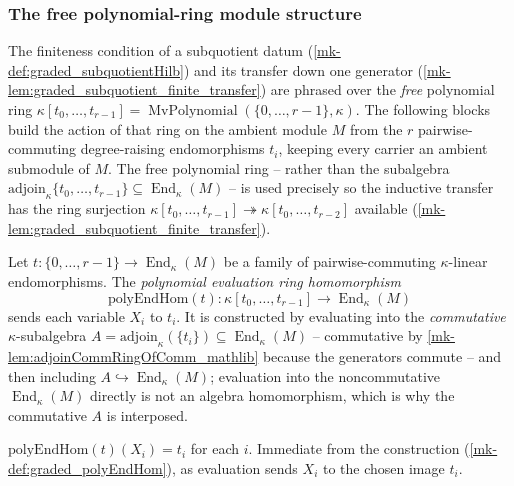 \subsubsection*{The free polynomial-ring module structure}

The finiteness condition of a subquotient datum (\ref{mk-def:graded_subquotientHilb}) and
its transfer down one generator (\ref{mk-lem:graded_subquotient_finite_transfer}) are
phrased over the \emph{free} polynomial ring \(\kappa[t_0, \dots, t_{r-1}] =
\operatorname{MvPolynomial}(\{0, \dots, r-1\}, \kappa)\). The following blocks build the
action of that ring on the ambient module \(M\) from the \(r\) pairwise-commuting
degree-raising endomorphisms \(t_i\), keeping every carrier an ambient submodule of
\(M\). The free polynomial ring -- rather than the subalgebra
\(\mathrm{adjoin}_\kappa\{t_0, \dots, t_{r-1}\} \subseteq \operatorname{End}_\kappa(M)\)
-- is used precisely so the inductive transfer has the ring surjection
\(\kappa[t_0, \dots, t_{r-1}] \twoheadrightarrow \kappa[t_0, \dots, t_{r-2}]\) available
(\ref{mk-lem:graded_subquotient_finite_transfer}).

\begin{definition}\label{mk-def:graded_polyEndHom}
  \leanok

  Let \(t : \{0, \dots, r-1\} \to \operatorname{End}_\kappa(M)\) be a family of
  pairwise-commuting \(\kappa\)-linear endomorphisms. The \emph{polynomial evaluation
  ring homomorphism}
  \[
    \mathrm{polyEndHom}(t) : \kappa[t_0, \dots, t_{r-1}] \longrightarrow
      \operatorname{End}_\kappa(M)
  \]
  sends each variable \(X_i\) to \(t_i\). It is constructed by evaluating into the
  \emph{commutative} \(\kappa\)-subalgebra \(A = \mathrm{adjoin}_\kappa(\{t_i\})
  \subseteq \operatorname{End}_\kappa(M)\) -- commutative by
  \ref{mk-lem:adjoinCommRingOfComm_mathlib} because the generators commute -- and then
  including \(A \hookrightarrow \operatorname{End}_\kappa(M)\); evaluation into the
  noncommutative \(\operatorname{End}_\kappa(M)\) directly is not an algebra
  homomorphism, which is why the commutative \(A\) is interposed.
\end{definition}

\begin{lemma}\label{mk-lem:graded_polyEndHom_X}
  \leanok

  \(\mathrm{polyEndHom}(t)(X_i) = t_i\) for each \(i\). Immediate from the construction
  (\ref{mk-def:graded_polyEndHom}), as evaluation sends \(X_i\) to the chosen image
  \(t_i\).
\end{lemma}

